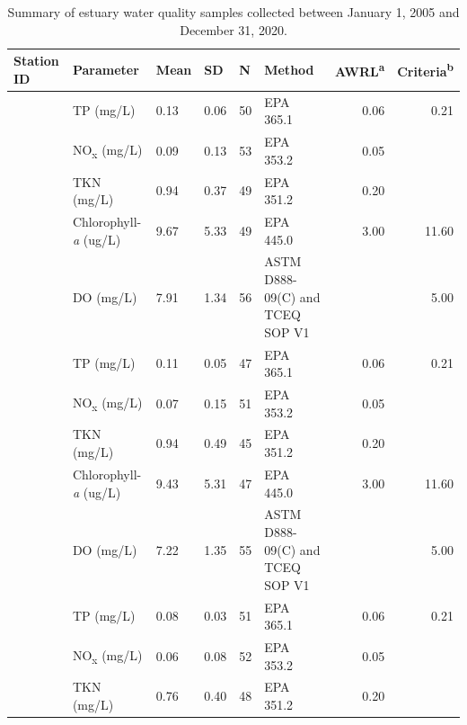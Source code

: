 \documentclass[fleqn,10pt,lineno]{wlpeerj} %
\begin{document}
\begin{table}

\caption{\label{tab:table2}Summary of estuary water quality samples collected between January 1, 2005 and December 31, 2020.}
\centering
\begin{threeparttable}
\begin{tabular}[t]{>{\raggedright\arraybackslash}p{2cm}llll>{\raggedright\arraybackslash}p{2.5cm}rr}
\toprule
Station ID & Parameter & Mean & SD & N & Method & AWRL\textsuperscript{a} & Criteria\textsuperscript{b}\\
\midrule
 & TP (mg/L) & 0.13 & 0.06 & 50 & EPA 365.1 & 0.06 & 0.21\\

 & NO\textsubscript{x} (mg/L) & 0.09 & 0.13 & 53 & EPA 353.2 & 0.05 & \\

 & TKN (mg/L) & 0.94 & 0.37 & 49 & EPA 351.2 & 0.20 & \\

 & Chlorophyll-\textit{a} (ug/L) & 9.67 & 5.33 & 49 & EPA 445.0 & 3.00 & 11.60\\

\multirow{-5}{2cm}{\raggedright\arraybackslash TCEQ-13563, Upper-Bay} & DO (mg/L) & 7.91 & 1.34 & 56 & ASTM D888-09(C) and TCEQ SOP V1 &  & 5.00\\
\cmidrule{1-8}
 & TP (mg/L) & 0.11 & 0.05 & 47 & EPA 365.1 & 0.06 & 0.21\\

 & NO\textsubscript{x} (mg/L) & 0.07 & 0.15 & 51 & EPA 353.2 & 0.05 & \\

 & TKN (mg/L) & 0.94 & 0.49 & 45 & EPA 351.2 & 0.20 & \\

 & Chlorophyll-\textit{a} (ug/L) & 9.43 & 5.31 & 47 & EPA 445.0 & 3.00 & 11.60\\

\multirow{-5}{2cm}{\raggedright\arraybackslash TCEQ-13383, Mid-Bay} & DO (mg/L) & 7.22 & 1.35 & 55 & ASTM D888-09(C) and TCEQ SOP V1 &  & 5.00\\
\cmidrule{1-8}
 & TP (mg/L) & 0.08 & 0.03 & 51 & EPA 365.1 & 0.06 & 0.21\\

 & NO\textsubscript{x} (mg/L) & 0.06 & 0.08 & 52 & EPA 353.2 & 0.05 & \\

 & TKN (mg/L) & 0.76 & 0.40 & 48 & EPA 351.2 & 0.20 & \\


\end{tabular}
\end{threeparttable}
\end{table}
\end{document}
